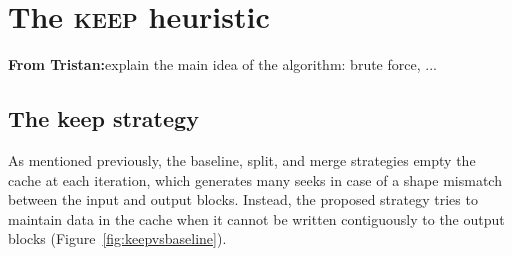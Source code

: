 \documentclass[sigconf, nonacm]{acmart}
\newcommand{\tristan}[1]{\color{orange}\textbf{From Tristan:}#1\color{black}}
\newcommand{\keep}[0]{\textsc{keep}\xspace}
\begin{document}




\section{The \keep heuristic}

\tristan{explain the main idea of the algorithm: brute force, ...}

\subsection{The keep strategy}
As mentioned previously, the baseline, split, and merge strategies empty the
cache at each iteration, which generates many seeks in case of a shape
mismatch between the input and output blocks. Instead, the proposed
strategy tries to maintain data in the cache when it cannot be written contiguously
to the output blocks (Figure~\ref{fig:keepvsbaseline}).

\end{document}
